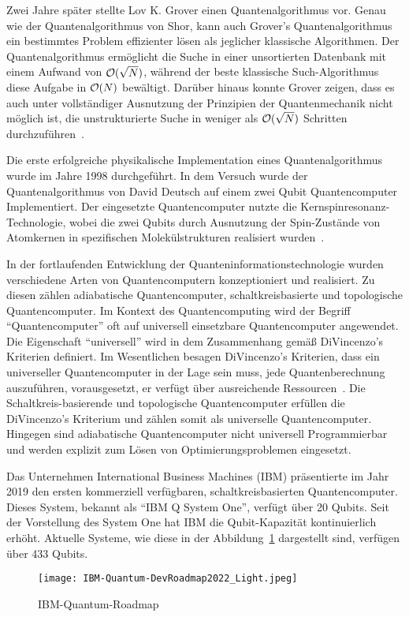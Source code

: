 Zwei Jahre später stellte Lov K. Grover einen Quantenalgorithmus vor.
Genau wie der Quantenalgorithmus von Shor, kann auch Grover's Quantenalgorithmus ein bestimmtes Problem effizienter lösen  als jeglicher klassische Algorithmen.
Der Quantenalgorithmus ermöglicht die Suche in einer unsortierten Datenbank mit einem Aufwand von \(\operatorname{\mathcal{O}}(\sqrt N)\), 
während der beste klassische Such-Algorithmus diese Aufgabe in \(\operatorname{\mathcal{O}}(N)\) bewältigt. 
Darüber hinaus konnte Grover zeigen, 
dass es auch unter vollständiger Ausnutzung der Prinzipien der Quantenmechanik nicht möglich ist, 
die unstrukturierte Suche in weniger als \(\operatorname{\mathcal{O}}(\sqrt N)\) Schritten durchzuführen~\cite{grover1996fast}.

Die erste erfolgreiche physikalische Implementation eines Quantenalgorithmus wurde im Jahre 1998 durchgeführt.
In dem Versuch wurde der Quantenalgorithmus von David Deutsch auf einem zwei Qubit Quantencomputer Implementiert.
Der eingesetzte Quantencomputer nutzte die Kernspinresonanz-Technologie, 
wobei die zwei Qubits durch Ausnutzung der Spin-Zustände von Atomkernen in spezifischen Molekülstrukturen realisiert wurden~\cite{Jones_1998}.

In der fortlaufenden Entwicklung der Quanteninformationstechnologie wurden verschiedene Arten von Quantencomputern konzeptioniert und realisiert.
Zu diesen zählen adiabatische Quantencomputer, schaltkreisbasierte und topologische Quantencomputer.
Im Kontext des Quantencomputing wird der Begriff "`Quantencomputer"' oft auf universell einsetzbare Quantencomputer angewendet.
Die Eigenschaft "`universell"' wird in dem Zusammenhang gemäß DiVincenzo's Kriterien definiert. 
Im Wesentlichen besagen DiVincenzo's Kriterien, dass ein universeller Quantencomputer in der Lage sein muss, jede Quantenberechnung auszuführen, vorausgesetzt, er verfügt über ausreichende Ressourcen~\cite{DiVincenzo_2000}.
Die Schaltkreis-basierende und topologische Quantencomputer erfüllen die DiVincenzo's Kriterium und zählen somit als universelle Quantencomputer.
Hingegen sind adiabatische Quantencomputer nicht universell Programmierbar und werden explizit zum Lösen von Optimierungsproblemen eingesetzt.

Das Unternehmen International Business Machines (IBM) präsentierte im Jahr 2019 den ersten kommerziell verfügbaren, schaltkreisbasierten Quantencomputer.
Dieses System, bekannt als "`IBM Q System One"', verfügt über 20 Qubits.
Seit der Vorstellung des System One hat IBM die Qubit-Kapazität kontinuierlich erhöht. 
Aktuelle Systeme, wie diese in der Abbildung~\ref{fig:IBM-Quantum-DevRoadmap2022} dargestellt sind, verfügen über 433 Qubits.
\begin{figure}
\caption{IBM-Quantum-Roadmap~\cite{IBM_2023}}
\label{fig:IBM-Quantum-DevRoadmap2022}
\texttt{[image: IBM-Quantum-DevRoadmap2022\_Light.jpeg]}
\centering
\end{figure}

